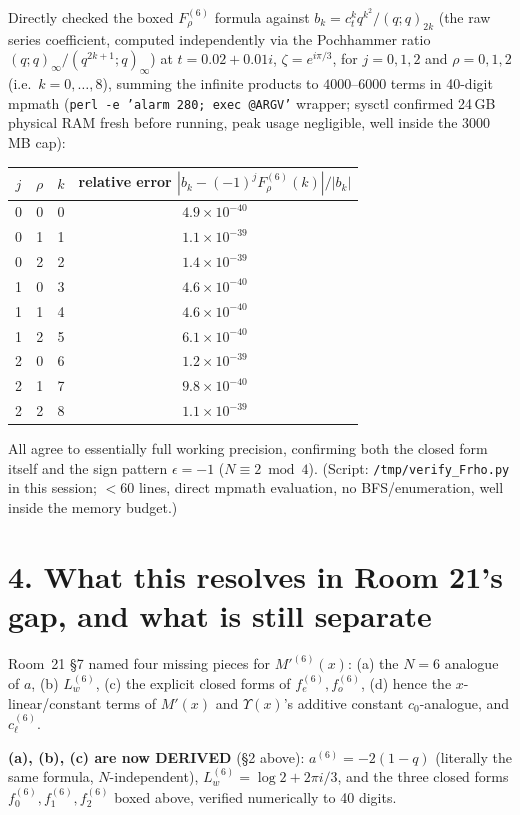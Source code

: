 \documentclass[11pt]{article}
\begin{document}
Directly checked the boxed $F_\rho^{(6)}$ formula against $b_k=c_t^kq^{k^2}/(q;q)_{2k}$ (the raw
series coefficient, computed independently via the Pochhammer ratio $(q;q)_\infty/(q^{2k+1};q)_\infty$)
at $t=0.02+0.01i$, $\zeta=e^{i\pi/3}$, for $j=0,1,2$ and $\rho=0,1,2$ (i.e.\ $k=0,\ldots,8$), summing
the infinite products to $4000$--$6000$ terms in 40-digit mpmath (\texttt{perl -e 'alarm 280; exec
@ARGV'} wrapper; sysctl confirmed 24\,GB physical RAM fresh before running, peak usage negligible,
well inside the 3000\,MB cap):
\begin{center}
\begin{tabular}{ccc|c}
$j$ & $\rho$ & $k$ & relative error $|b_k-(-1)^jF_\rho^{(6)}(k)|/|b_k|$\\\hline
0&0&0&$4.9\times10^{-40}$\\
0&1&1&$1.1\times10^{-39}$\\
0&2&2&$1.4\times10^{-39}$\\
1&0&3&$4.6\times10^{-40}$\\
1&1&4&$4.6\times10^{-40}$\\
1&2&5&$6.1\times10^{-40}$\\
2&0&6&$1.2\times10^{-39}$\\
2&1&7&$9.8\times10^{-40}$\\
2&2&8&$1.1\times10^{-39}$\\
\end{tabular}
\end{center}
All agree to essentially full working precision, confirming both the closed form itself and the
sign pattern $\epsilon=-1$ ($N\equiv2\bmod4$). (Script: \texttt{/tmp/verify\_Frho.py} in this
session; $<60$ lines, direct mpmath evaluation, no BFS/enumeration, well inside the memory budget.)

\section*{4. What this resolves in Room 21's gap, and what is still separate}

Room~21 \S7 named four missing pieces for $M'^{(6)}(x)$: (a) the $N=6$ analogue of $a$, (b) $L_w^{(6)}$,
(c) the explicit closed forms of $f_e^{(6)},f_o^{(6)}$, (d) hence the $x$-linear/constant terms of
$M'(x)$ and $\Upsilon(x)$'s additive constant $c_0$-analogue, and $c_\ell^{(6)}$.

\textbf{(a), (b), (c) are now DERIVED} (\S2 above): $a^{(6)}=-2(1-q)$ (literally the same formula,
$N$-independent), $L_w^{(6)}=\log2+2\pi i/3$, and the three closed forms $f_0^{(6)},f_1^{(6)},f_2^{(6)}$
boxed above, verified numerically to 40 digits.
\end{document}
